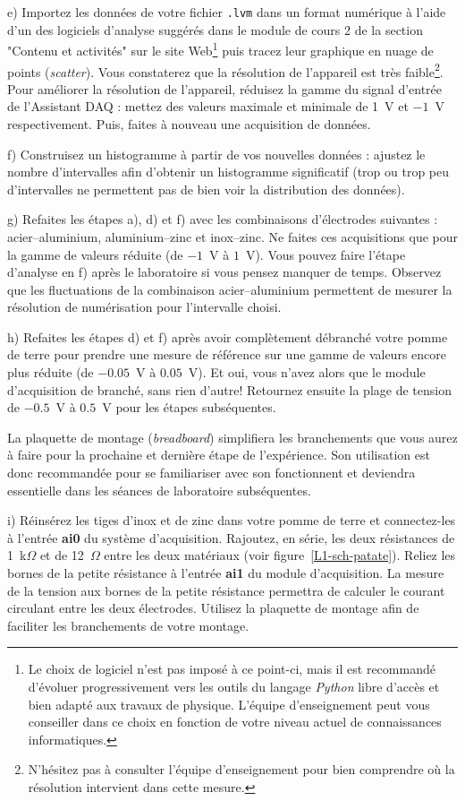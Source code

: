 \documentclass[canadien,12pt,oneside,letterpaper]{article}
\begin{document}
e) Importez les données de votre fichier \texttt{.lvm} dans un format numérique à l'aide d'un des logiciels d'analyse suggérés dans le module de cours 2 de la section "Contenu et activités" sur le site Web\footnote{Le choix de logiciel n'est pas imposé à ce point-ci, mais il est recommandé d'évoluer progressivement vers les outils du langage \textit{Python} libre d'accès et bien adapté aux travaux de physique. L'équipe d'enseignement peut vous conseiller dans ce choix en fonction de votre niveau actuel de connaissances informatiques.} puis tracez leur graphique en nuage de points (\textit{scatter}). Vous constaterez que la résolution de l'appareil est très faible\footnote{N'hésitez pas à consulter l'équipe d'enseignement pour bien comprendre où la résolution intervient dans cette mesure.}. Pour améliorer la résolution de l'appareil, réduisez la gamme du signal d'entrée de l'Assistant DAQ : mettez des valeurs maximale et minimale de 1~V et $-1$~V respectivement. Puis, faites à nouveau une acquisition de données.

f) Construisez un histogramme à partir de vos nouvelles données : ajustez le nombre d'intervalles afin d'obtenir un histogramme significatif (trop ou trop peu d'intervalles ne permettent pas de bien voir la distribution des données).

g) Refaites les étapes a), d) et f) avec les combinaisons d'électrodes suivantes : acier--aluminium, aluminium--zinc et inox--zinc. Ne faites ces acquisitions que pour la gamme de valeurs réduite (de $-1$~V à $1$~V). Vous pouvez faire l'étape d'analyse en f) après le laboratoire si vous pensez manquer de temps. Observez que les fluctuations de la combinaison acier--aluminium permettent de mesurer la résolution de numérisation pour l'intervalle choisi.

h) Refaites les étapes d) et f) après avoir complètement débranché votre pomme de terre pour prendre une mesure de référence sur une gamme de valeurs encore plus réduite (de $-0.05$~V à $0.05$~V). Et oui, vous n’avez alors que le module d’acquisition de branché, sans rien d’autre! Retournez ensuite la plage de tension de $-0.5$~V à $0.5$~V pour les étapes subséquentes.

La plaquette de montage (\textit{breadboard}) simplifiera les branchements que vous aurez à faire pour la prochaine et dernière étape de l'expérience. Son utilisation est donc recommandée pour se familiariser avec son fonctionnent et deviendra essentielle dans les séances de laboratoire subséquentes.

i) Réinsérez les tiges d'inox et de zinc dans votre pomme de terre et connectez-les à l'entrée \textbf{ai0} du système d'acquisition. Rajoutez, en série, les deux résistances de 1~k$\Omega$ et de 12~$\Omega$ entre les deux matériaux (voir figure~\ref{L1-sch-patate}). Reliez les bornes de la petite résistance à l'entrée \textbf{ai1} du module d'acquisition. La mesure de la tension aux bornes de la petite résistance permettra de calculer le courant circulant entre les deux électrodes. Utilisez la plaquette de montage afin de faciliter les branchements de votre montage.
\end{document}
